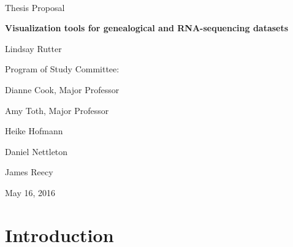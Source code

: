 \documentclass[11pt,a4paper,oldfontcommands,openany]{memoir}
\numberwithin{equation}{section} %
\begin{document}
\sloppy


{
\centering
~\vspace{\fill}

\vspace{2.5cm}

{\LARGE Thesis Proposal}

\vspace{1cm}

{\LARGE\textbf{Visualization tools for genealogical and RNA-sequencing datasets}}

\vspace{1cm}

{\LARGE Lindsay Rutter}

\vspace{4cm}

{\LARGE Program of Study Committee:}

\vspace{1cm}

{\LARGE Dianne Cook, Major Professor}

\vspace{.25cm}

{\LARGE Amy Toth, Major Professor}

\vspace{.25cm}

{\LARGE Heike Hofmann}

\vspace{.25cm}

{\LARGE Daniel Nettleton}

\vspace{.25cm}

{\LARGE James Reecy}

\vspace{2.5cm}

{\centerline{\large May 16, 2016}}
}

\clearpage

\setsecheadstyle{\Large\bfseries\sffamily\raggedright}
\setsubsecheadstyle{\large\bfseries\sffamily\raggedright}
\setsubsubsecheadstyle{\bfseries\sffamily\raggedright}

\tableofcontents

\setlength{\parskip}{10pt} %

\OnehalfSpacing

\chapter{Introduction}
\end{document}
